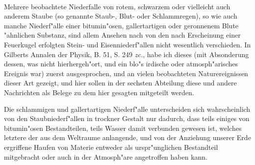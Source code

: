 \documentclass[a4paper, 11pt, oneside, polutonikogreek, german]{article}
\begin{document}
\paragraph{}
Mehrere beobachtete Niederfalle von rotem, schwarzem oder vielleicht auch anderem Staube (so genannte Staub-, Blut- oder Schlammregen), so wie auch manche Niederf"alle einer bitumin"osen, gallertartigen oder geronnenem Blute "ahnlichen Substanz, sind allem Ansehen nach von den nach Erscheinung einer Feuerkugel erfolgten Stein- und Eisenniederf"allen nicht wesentlich verschieden. In Gilberts Annalen der Physik, B. 51, S. 249 \emph{zc.}, habe ich dieses (mit Absonderung dessen, was nicht hierhergeh"ort, und ein blo"s irdische oder atmosph"arisches Ereignis war) zuerst ausgesprochen, und an vielen beobachteten Naturereignissen dieser Art gezeigt, und hier sollen in der sechsten Abteilung diese und andere Nachrichten als Belege zu dem hier gesagten mitgeteilt werden.

Die schlammigen und gallertartigen Niederf"alle unterscheiden sich wahrscheinlich von den Staubniederf"allen in trockner Gestalt nur dadurch, dass teils einiges von bitumin"osen Bestandteilen, teils Wasser damit verbunden gewesen ist, welches letztere der aus dem Weltraume anlangende, und von der Anziehung unserer Erde ergriffene Haufen von Materie entweder als urspr"unglichen Bestandteil mitgebracht oder auch in der Atmosph"are angetroffen haben kann.
\end{document}
